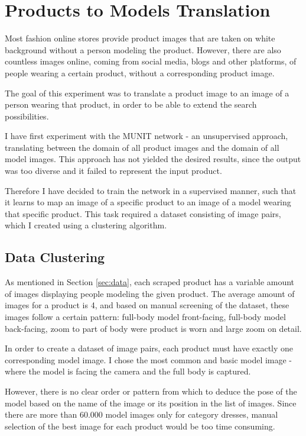 \documentclass[12pt]{report}
\begin{document}
\section{Products to Models Translation}
Most fashion online stores provide product images that are taken on white background without a person modeling the product. However, there are also countless images online, coming from social media, blogs and other platforms, of people wearing a certain product, without a corresponding product image. 

The goal of this experiment was to translate a product image to an image of a person wearing that product, in order to be able to extend the search possibilities.

I have first experiment with the MUNIT network - an unsupervised approach, translating between the domain of all product images and the domain of all model images. This approach has not yielded the desired results, since the output was too diverse and it failed to represent the input product.

Therefore I have decided to train the network in a supervised manner, such that it learns to map an image of a specific product to an image of a model wearing that specific product. This task required a dataset consisting of image pairs, which I created using a clustering algorithm.

\pagebreak
\subsection{Data Clustering}
As mentioned in Section \ref{sec:data}, each scraped product has a variable amount of images displaying people modeling the given product. The average amount of images for a product is 4, and based on manual screening of the dataset, these images follow a certain pattern: full-body model front-facing, full-body model back-facing, zoom to part of body were product is worn and large zoom on detail.

In order to create a dataset of image pairs, each product must have exactly one corresponding model image. I chose the most common and basic model image - where the model is facing the camera and the full body is captured. 

However, there is no clear order or pattern from which to deduce the pose of the model based on the name of the image or its position in the list of images. Since there are more than 60.000 model images only for category dresses, manual selection of the best image for each product would be too time consuming.
\end{document}
